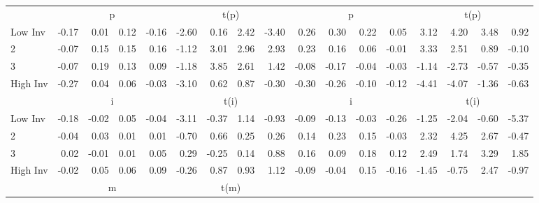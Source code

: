 \begin{table}[!ht]
\begin{tabular}{lrrrrrrrrrrrrrrrr}
  
    
      & \multicolumn{4}{c}{p} & \multicolumn{4}{c}{t(p)}
    
      & \multicolumn{4}{c}{p} & \multicolumn{4}{c}{t(p)}
    
    \\
      \cmidrule(r){2-5} \cmidrule(r){6-9} \cmidrule(r){10-13} \cmidrule(r){14-17}

    Low Inv   & -0.17  & 0.01  & 0.12  & -0.16  & -2.60  & 0.16  & 2.42  & -3.40  & 0.26  & 0.30  & 0.22  & 0.05  & 3.12  & 4.20  & 3.48  & 0.92  \\
           2  & -0.07  & 0.15  & 0.15  & 0.16  & -1.12  & 3.01  & 2.96  & 2.93  & 0.23  & 0.16  & 0.06  & -0.01  & 3.33  & 2.51  & 0.89  & -0.10  \\
           3  & -0.07  & 0.19  & 0.13  & 0.09  & -1.18  & 3.85  & 2.61  & 1.42  & -0.08  & -0.17  & -0.04  & -0.03  & -1.14  & -2.73  & -0.57  & -0.35  \\
    High Inv  & -0.27  & 0.04  & 0.06  & -0.03  & -3.10  & 0.62  & 0.87  & -0.30  & -0.30  & -0.26  & -0.10  & -0.12  & -4.41  & -4.07  & -1.36  & -0.63  \\

  
    
      & \multicolumn{4}{c}{i} & \multicolumn{4}{c}{t(i)}
    
      & \multicolumn{4}{c}{i} & \multicolumn{4}{c}{t(i)}
    
    \\
      \cmidrule(r){2-5} \cmidrule(r){6-9} \cmidrule(r){10-13} \cmidrule(r){14-17}

    Low Inv   & -0.18  & -0.02  & 0.05  & -0.04  & -3.11  & -0.37  & 1.14  & -0.93  & -0.09  & -0.13  & -0.03  & -0.26  & -1.25  & -2.04  & -0.60  & -5.37  \\
           2  & -0.04  & 0.03  & 0.01  & 0.01  & -0.70  & 0.66  & 0.25  & 0.26  & 0.14  & 0.23  & 0.15  & -0.03  & 2.32  & 4.25  & 2.67  & -0.47  \\
           3  & 0.02  & -0.01  & 0.01  & 0.05  & 0.29  & -0.25  & 0.14  & 0.88  & 0.16  & 0.09  & 0.18  & 0.12  & 2.49  & 1.74  & 3.29  & 1.85  \\
    High Inv  & -0.02  & 0.05  & 0.06  & 0.09  & -0.26  & 0.87  & 0.93  & 1.12  & -0.09  & -0.04  & 0.15  & -0.16  & -1.45  & -0.75  & 2.47  & -0.97  \\

  
    
      & \multicolumn{4}{c}{m} & \multicolumn{4}{c}{t(m)}
    

\end{tabular}
\end{table}
